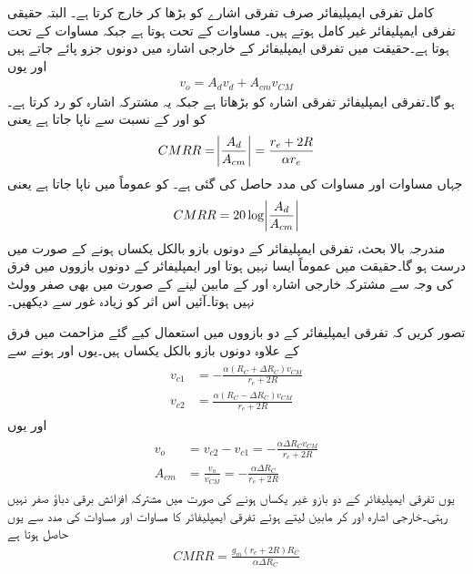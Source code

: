 کامل تفرقی ایمپلیفائر صرف تفرقی اشارے کو بڑھا کر خارج کرتا ہے۔ البتہ حقیقی تفرقی ایمپلیفائر غیر کامل ہوتے ہیں۔ مساوات   کے تحت  ہوتا ہے جبکہ مساوات   کے تحت   ہوتا ہے۔حقیقت میں تفرقی ایمپلیفائر کے خارجی اشارہ میں دونوں جزو پائے جاتے ہیں اور یوں
\begin{align}
v_o = A_d v_d + A_{cm} v_{CM}
\end{align}
ہو گا۔تفرقی ایمپلیفائر تفرقی اشارہ کو بڑھاتا ہے جبکہ یہ مشترکہ اشارہ کو رد کرتا ہے۔   کو   اور    کے نسبت  سے ناپا جاتا ہے یعنی
\begin{align}
CMRR=\abs{ \frac{A_d}{A_{cm}} } =\frac{r_e + 2 R}{\alpha r_e}
\end{align}
جہاں مساوات   اور مساوات   کی مدد حاصل کی گئی ہے۔  کو عموماً   میں ناپا جاتا ہے یعنی
\begin{align}
CMRR= 20 \log \abs{\frac{A_d}{A_{cm}}}
\end{align}
مندرجہ بالا بحث، تفرقی ایمپلیفائر کے دونوں بازو بالکل یکساں ہونے کے صورت میں درست ہو گا۔حقیقت میں عموماً ایسا نہیں ہوتا اور ایمپلیفائر کے دونوں بازووں میں فرق کی وجہ سے  مشترکہ خارجی اشارہ   اور  کے مابین لینے کے صورت میں بھی صفر وولٹ نہیں ہوتا۔آئیں اس اثر کو زیادہ غور سے دیکھیں۔

تصور کریں کہ تفرقی ایمپلیفائر کے دو بازووں میں استعمال کیے گئے مزاحمت  میں فرق کے علاوہ دونوں بازو بالکل یکساں ہیں۔یوں  اور   ہونے سے
\begin{gather}
\begin{aligned}
v_{c1} &=-\frac{\alpha \left(R_C+\Delta R_C \right ) v_{CM}}{r_e+2 R}\\
v_{c2} &=\frac{\alpha \left(R_C - \Delta R_C \right ) v_{CM}}{r_e+2 R}
\end{aligned}
\end{gather}
اور یوں
\begin{gather}
\begin{aligned}
v_o &=v_{c2}-v_{c1}=-\frac{\alpha \Delta R_C v_{CM}}{r_e + 2R}\\
A_{cm} &=\frac{v_o}{v_{CM}} =-\frac{\alpha \Delta R_C}{r_e + 2R} \label{مساوات_تفرقی_مشترک_افزائش}
\end{aligned}
\end{gather}
یوں تفرقی ایمپلیفائر کے دو بازو غیر یکساں ہونے کی صورت میں مشترکہ افزائش برقی دباؤ صفر نہیں رہتی۔خارجی اشارہ  اور  کر مابین لیتے ہوئے تفرقی ایمپلیفائر کا   مساوات   اور مساوات   کی مدد سے یوں حاصل ہوتا ہے
\begin{align}
CMRR=\frac{g_m \left(r_e + 2 R \right ) R_C}{\alpha \Delta R_C}
\end{align}

